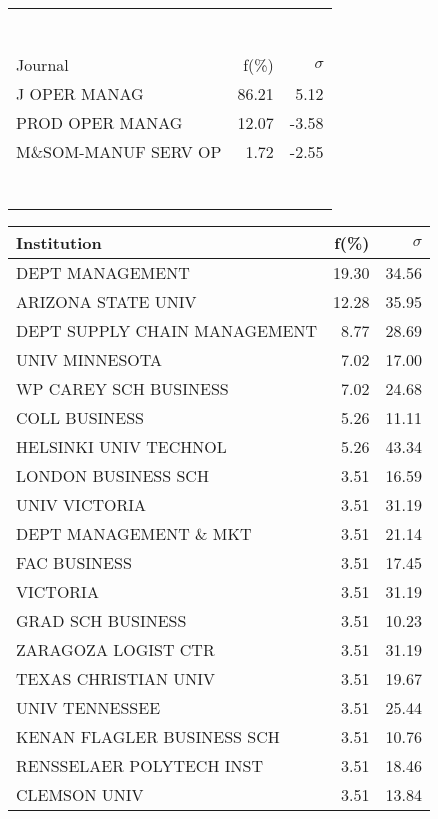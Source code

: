 \documentclass[a4paper,11pt]{report}
\begin{document}
\begin{landscape}
\begin{table}[!ht]
{\begin{tabular}{|l r r|}
 &  & \\
 &  & \\
 &  & \\
 &  & \\
 &  & \\
 &  & \\
 &  & \\
\hline
\hline
Journal & f(\%) & $\sigma$\\
\hline
J OPER MANAG & 86.21 & 5.12\\
PROD OPER MANAG & 12.07 & -3.58\\
M\&SOM-MANUF SERV OP & 1.72 & -2.55\\
 &  & \\
 &  & \\
 &  & \\
 &  & \\
 &  & \\
 &  & \\
 &  & \\
\hline
\end{tabular}
}
{\scriptsize\begin{tabular}{|l r r|}
\hline
Institution & f(\%) & $\sigma$\\
\hline
DEPT MANAGEMENT & 19.30 & 34.56\\
ARIZONA STATE UNIV & 12.28 & 35.95\\
DEPT SUPPLY CHAIN MANAGEMENT & 8.77 & 28.69\\
UNIV MINNESOTA & 7.02 & 17.00\\
WP CAREY SCH BUSINESS & 7.02 & 24.68\\
COLL BUSINESS & 5.26 & 11.11\\
HELSINKI UNIV TECHNOL & 5.26 & 43.34\\
LONDON BUSINESS SCH & 3.51 & 16.59\\
UNIV VICTORIA & 3.51 & 31.19\\
DEPT MANAGEMENT \& MKT & 3.51 & 21.14\\
FAC BUSINESS & 3.51 & 17.45\\
VICTORIA & 3.51 & 31.19\\
GRAD SCH BUSINESS & 3.51 & 10.23\\
ZARAGOZA LOGIST CTR & 3.51 & 31.19\\
TEXAS CHRISTIAN UNIV & 3.51 & 19.67\\
UNIV TENNESSEE & 3.51 & 25.44\\
KENAN FLAGLER BUSINESS SCH & 3.51 & 10.76\\
RENSSELAER POLYTECH INST & 3.51 & 18.46\\
CLEMSON UNIV & 3.51 & 13.84\\

\end{tabular}}
\end{table}
\end{landscape}
\end{document}
